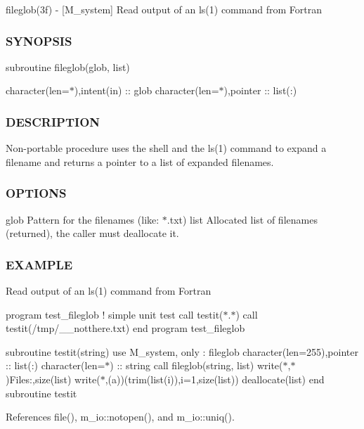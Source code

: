 fileglob(3f) -\/ \mbox{[}M\+\_\+system\mbox{]} Read output of an ls(1) command from Fortran \subsubsection*{S\+Y\+N\+O\+P\+S\+IS}

subroutine fileglob(glob, list)

character(len=$\ast$),intent(in) \+:\+: glob character(len=$\ast$),pointer \+:\+: list(\+:)

\subsubsection*{D\+E\+S\+C\+R\+I\+P\+T\+I\+ON}

Non-\/portable procedure uses the shell and the ls(1) command to expand a filename and returns a pointer to a list of expanded filenames. \subsubsection*{O\+P\+T\+I\+O\+NS}

glob Pattern for the filenames (like\+: $\ast$.txt) list Allocated list of filenames (returned), the caller must deallocate it.

\subsubsection*{E\+X\+A\+M\+P\+LE}

Read output of an ls(1) command from Fortran

program test\+\_\+fileglob ! simple unit test call testit(\textquotesingle{}$\ast$.$\ast$\textquotesingle{}) call testit(\textquotesingle{}/tmp/\+\_\+\+\_\+notthere.txt\textquotesingle{}) end program test\+\_\+fileglob

subroutine testit(string) use M\+\_\+system, only \+: fileglob character(len=255),pointer \+:\+: list(\+:) character(len=$\ast$) \+:\+: string call fileglob(string, list) write($\ast$,$\ast$)\textquotesingle{}Files\+:\textquotesingle{},size(list) write($\ast$,\textquotesingle{}(a)\textquotesingle{})(trim(list(i)),i=1,size(list)) deallocate(list) end subroutine testit 

References file(), m\+\_\+io\+::notopen(), and m\+\_\+io\+::uniq().

\mbox{\label{namespacem__system_ad813765403a5d9d6fb7a2edcb669fe4b}} 
